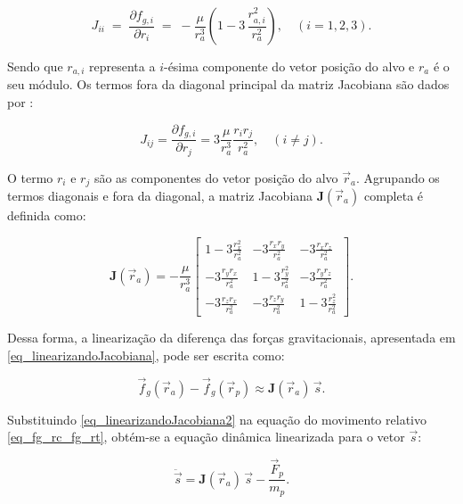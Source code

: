 \begin{equation}
\label{eq_jacobianaDiagonal}
J_{ii} \;=\;
\frac{\partial f_{g,i}}{\partial r_i} \;=\;
-\frac{\mu}{r_a^3}\!\left(1 - 3\,\frac{r_{a,i}^2}{r_a^2}\right), \quad (i=1,2,3).
\end{equation}

Sendo que $r_{a,i}$ representa a $i$-ésima componente do vetor posição do alvo e $r_a$ é o seu módulo.
Os termos fora da diagonal principal da matriz Jacobiana são dados por \cite{fehse2003}:

\begin{equation}
\label{eq_jacobianaForaDiagonal}
J_{ij} =
\frac{\partial f_{g,i}}{\partial r_j} =
3 \frac{\mu}{r_a^3} \frac{r_i r_j}{r_a^2}, \quad (i \neq j).
\end{equation}

O termo $r_i$ e $r_j$ são as componentes do vetor posição do alvo $\vec{r}_a$.
Agrupando os termos diagonais e fora da diagonal, a matriz Jacobiana $\mathbf{J}(\vec{r}_a)$ completa é definida como:

\begin{equation}
\label{eq_jacobianaGenerica}
\mathbf{J}(\vec{r}_a) = -\frac{\mu}{r_a^3}
\begin{bmatrix}
1 - 3\frac{r_x^2}{r_a^2} &  -3\frac{r_x r_y}{r_a^2} &  -3\frac{r_x r_z}{r_a^2} \\
-3\frac{r_y r_x}{r_a^2} & 1 - 3\frac{r_y^2}{r_a^2} & -3\frac{r_y r_z}{r_a^2} \\
-3\frac{r_z r_x}{r_a^2} & -3\frac{r_z r_y}{r_a^2} & 1 - 3\frac{r_z^2}{r_a^2}
\end{bmatrix}.
\end{equation}

Dessa forma, a linearização da diferença das forças gravitacionais, apresentada em \eqref{eq_linearizandoJacobiana}, pode ser escrita como:

\begin{equation}
\label{eq_linearizandoJacobiana2}
\vec f_g(\vec r_{a}) - \vec f_g(\vec r_{p}) \approx \mathbf{J}(\vec{r}_a)\,\vec s.
\end{equation}

Substituindo \eqref{eq_linearizandoJacobiana2} na equação do movimento relativo \eqref{eq_fg_rc_fg_rt}, obtém-se a equação dinâmica linearizada para o vetor $\vec{s}$:

\begin{equation}
\label{eq_fg_rc_fg_rt_linearizada}  
\ddot{\vec{s}} = \mathbf{J}(\vec{r}_a)\,\vec{s} - \frac{\vec F_p}{m_{p}}.
\end{equation}

